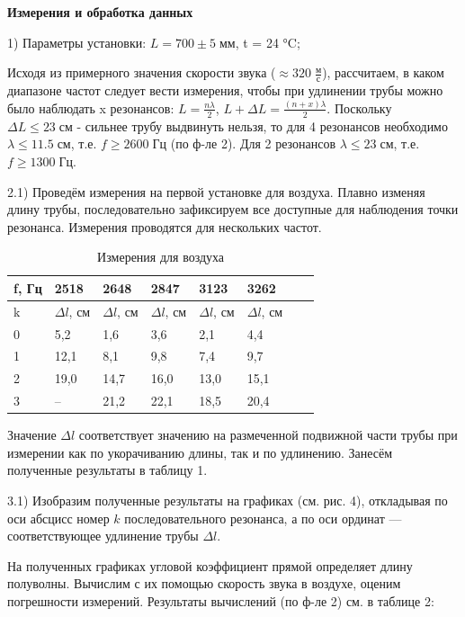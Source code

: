 \documentclass[a4paper,11pt]{extarticle} %
\begin{document}
\textbf{Измерения и обработка данных}

		1) Параметры установки:
		$L = 700\pm 5 \; \text{мм}$, t = 24 °C;
		
		Исходя из примерного значения скорости звука ($ \approx 320 \; \frac{\text{м}}{\text{с}}$), рассчитаем, в каком диапазоне частот следует вести измерения, чтобы при удлинении трубы можно было наблюдать x резонансов:
$L = \frac{n\lambda}{2}$, $L + \Delta L = \frac{(n+x)\lambda}{2}$. Поскольку $\Delta L \leq 23 \; {\text{см}}$ - сильнее трубу выдвинуть нельзя, то для 4 резонансов необходимо $\lambda \leq 11.5 \; {\text{см}}$, т.е. $f \geq 2600 \; {\text{Гц}}$ (по ф-ле 2). Для 2 резонансов $\lambda \leq 23 \; {\text{см}}$, т.е. $f \geq 1300 \; {\text{Гц}}$.
		
		2.1) Проведём измерения на первой установке для воздуха.
		Плавно изменяя длину трубы, последовательно зафиксируем все доступные для наблюдения точки резонанса. Измерения проводятся для нескольких частот.
		\begin{table}
		\begin{center}
		\begin{tabular}{|l|l|l|l|l|l|l|l|}
			\hline
			f, Гц & 2518 & 2648 & 2847 & 3123  & 3262
			\\
			\hline
			k &  $\Delta l$, см& $\Delta l$, см& $\Delta l$, см& $\Delta l$, см& $\Delta l$, см
			\\
			
			\hline
			0 & 5,2 & 1,6 & 3,6 & 2,1 & 4,4
			\\
			\hline
			1 & 12,1 & 8,1 & 9,8 & 7,4 & 9,7 
			\\
			\hline
			2 & 19,0 & 14,7 & 16,0 & 13,0 & 15,1
			\\
			\hline
			3 & -- & 21,2 & 22,1 & 18,5 & 20,4
			\\
			\hline
		\end{tabular}
		\caption {Измерения для воздуха}
		\end{center}
		\end{table}
		Значение $\Delta l$ соответствует значению на размеченной подвижной части трубы при измерении как по укорачиванию длины, так и по удлинению.
		Занесём полученные результаты в таблицу 1.
		
		3.1) Изобразим полученные результаты на графиках (см. рис. 4), откладывая по оси абсцисс номер $k$ последовательного резонанса, а по оси ординат — соответствующее удлинение трубы
		$\Delta l$.

		
		На полученных графиках угловой коэффициент прямой определяет длину полуволны. Вычислим с их помощью скорость звука в воздухе, оценим погрешности измерений. Результаты вычислений (по ф-ле 2) см. в таблице 2:
		
\end{document}
